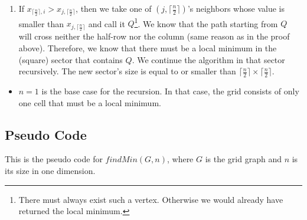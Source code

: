 \documentclass[12pt]{article}
\begin{document}
\begin{enumerate}
\begin{enumerate}
	\item If $x_{\lceil \frac{n}{2} \rceil, i} > x_{j, \lceil \frac{n}{2} \rceil}$, then we take one of $\left( j, \lceil \frac{n}{2} \rceil \right)$'s neighbors whose value is smaller than $x_{j, \lceil \frac{n}{2} \rceil}$ and call it $Q$\footnote{There must always exist such a vertex. Otherwise we would already have returned the local minimum.}. We know that the path starting from $Q$ will cross neither the half-row nor the column (same reason as in the proof above). Therefore, we know that there must be a local minimum in the (square) sector that contains $Q$. We continue the algorithm in that sector recursively. The new sector's size is equal to or smaller than $\lceil \frac{n}{2} \rceil \times \lceil \frac{n}{2} \rceil$.
	\end{enumerate}
\end{enumerate}
\begin{itemize}
	\item $n = 1$ is the base case for the recursion. In that case, the grid consists of only one cell that must be a local minimum.
\end{itemize}

\subsection*{Pseudo Code}
This is the pseudo code for $\mathit{findMin(G, n)}$, where $G$ is the grid graph and $n$ is its size in one dimension.
\end{document}
